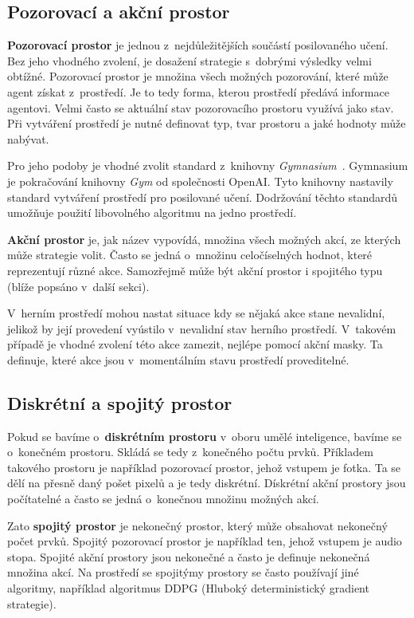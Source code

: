 \subsection{Pozorovací a akční prostor}
\label{subsec:prostory}

\textbf{Pozorovací prostor} je jednou z~nejdůležitějších součástí posilovaného učení.
Bez jeho vhodného zvolení, je dosažení strategie s~dobrými výsledky velmi obtížné.
Pozorovací prostor je množina všech možných pozorování, které může agent získat z~prostředí.
Je to tedy forma, kterou prostředí předává informace agentovi.
Velmi často se aktuální stav pozorovacího prostoru využívá jako stav.
Při vytváření prostředí je nutné definovat typ, tvar prostoru a jaké hodnoty může nabývat.

Pro jeho podoby je vhodné zvolit standard z~knihovny \emph{Gymnasium}~\cite{Gymnasium}.
Gymnasium je pokračování knihovny \textit{Gym} od společnosti OpenAI\@.
Tyto knihovny nastavily standard vytváření prostředí pro posilované učení.
Dodržování těchto standardů umožňuje použití libovolného algoritmu na jedno prostředí.

\bigskip

\textbf{Akční prostor} je, jak název vypovídá, množina všech možných akcí, ze kterých může strategie volit.
Často se jedná o~množinu celočíselných hodnot, které reprezentují různé akce.
Samozřejmě může být akční prostor i spojitého typu (blíže popsáno v~další sekci).

V~herním prostředí mohou nastat situace kdy se nějaká akce stane nevalidní, jelikož by její provedení vyústilo v~nevalidní stav herního prostředí.
V~takovém případě je vhodné zvolení této akce zamezit, nejlépe pomocí akční masky.
Ta definuje, které akce jsou v~momentálním stavu prostředí proveditelné.

\subsection{Diskrétní a spojitý prostor}\label{subsec:diskretni-a-spojity-prostor}

Pokud se bavíme o~\textbf{diskrétním prostoru} v~oboru umělé inteligence, bavíme se o~konečném prostoru. 
Skládá se tedy z~konečného počtu prvků.
Příkladem takového prostoru je například pozorovací prostor, jehož vstupem je fotka.
Ta se dělí na přesně daný pošet pixelů a je tedy diskrétní.
Dískrétní akční prostory jsou počítatelné a často se jedná o~konečnou množinu možných akcí.

Zato \textbf{spojitý prostor} je nekonečný prostor, který může obsahovat nekonečný počet prvků. 
Spojitý pozorovací prostor je například ten, jehož vstupem je audio stopa.
Spojité akční prostory jsou nekonečné a často je definuje nekonečná množina akcí.
Na prostředí se spojitýmy prostory se často používají jiné algoritmy, například algoritmus DDPG (Hluboký deterministický gradient strategie).

